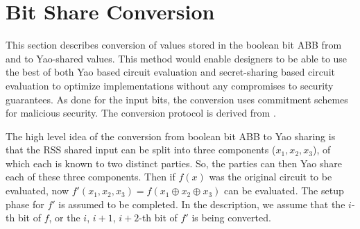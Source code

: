 \section{Bit Share Conversion}

This section describes conversion of values stored in the boolean bit ABB from and to Yao-shared values. This method would enable designers to be able to use the best of both Yao based circuit evaluation and secret-sharing based circuit evaluation to optimize implementations without any compromises to security guarantees. As done for the input bits, the conversion uses commitment schemes for malicious security. The conversion protocol is derived from \cite{CCS:MohRin18}. 

The high level idea of the conversion from boolean bit ABB to Yao sharing is that the RSS shared input can be split into three components ($x_1, x_2, x_3$), of which each is known to two distinct parties. So, the parties can then Yao share each of these three components. Then if $f(x)$ was the original circuit to be evaluated, now $f'(x_1, x_2, x_3) = f(x_1 \oplus x_2 \oplus x_3)$ can be evaluated. The setup phase for $f'$ is assumed to be completed. In the description, we assume that the $i$-th bit of $f$, or the $i$, $i+1$, $i+2$-th bit of $f'$ is being converted.

